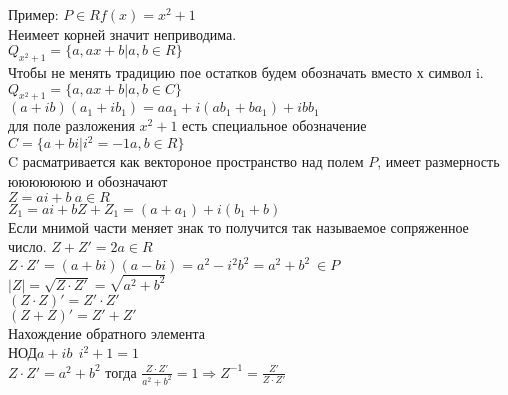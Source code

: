 Пример: $P\in R f(x) = x^2 + 1$\\
Неимеет корней значит неприводима.\\
$Q_{x^2+1} = \{a, ax + b | a,b\in R\}$\\
Чтобы не менять традицию пое остатков будем обозначать 
вместо х символ i.\\
$Q_{x^2+1} = \{a, ax + b | a,b\in C\}$\\
$(a + ib)(a_1 + ib_1) = 
a{a_1} + i(a{b_1} + b{a_1}) + ib{b_1}$\\
для поле разложения $x^2 + 1$ есть специальное обозначение
$C = \{a + bi | i^2 = -1 a,b\in R\}$\\
C расматривается как вектороное пространство над полем $P$,
имеет размерность ююююююю и обозначают\\
$Z = ai + b ~ a\in R$\\
$Z_1 = ai + b Z + Z_1 = (a + a_1) + i(b_1 + b)$\\
Если мнимой части меняет знак то получится так называемое 
сопряженное число.
$Z + Z' = 2a\in R$\\
$Z \cdot Z' = (a + bi)(a - bi) = a^2 - {i^2}{b^2} = 
a^2 + b^2 ~ \in P$\\
$|Z| = \sqrt{Z\cdot Z'} = \sqrt{a^2 + b^2}$\\
$(Z\cdot Z)' = Z' \cdot Z'$\\
$(Z + Z)' = Z' + Z'$\\

Нахождение обратного элемента\\
НОД$a+ib ~~ i^2 + 1 = 1$\\

$Z \cdot Z' = a^2 + b^2$ тогда 
$\frac{Z \cdot Z'}{a^2 + b^2} = 1 \Rightarrow 
Z^{-1} = \frac{Z'}{Z\cdot Z'}$\\

